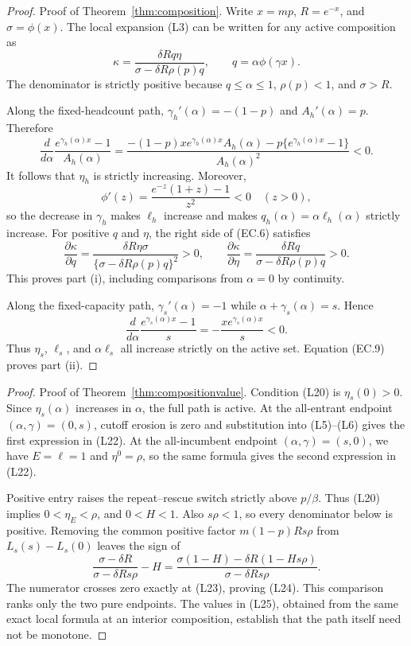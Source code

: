 \documentclass[mnsc,blindrev]{informs3}
\newcommand{\ph}{\phi}
\begin{document}
\begin{proof}{Proof of Theorem~\ref{thm:composition}.}
Write $x=mp$, $R=e^{-x}$, and $\sigma=\ph(x)$.  The local expansion (L3) can
be written for any active composition as
\[
 \kappa=\frac{\delta Rq\eta}
 {\sigma-\delta R\rho(p)q},
 \qquad q=\alpha\ph(\gamma x).                            \tag{EC.6}
\]
The denominator is strictly positive because
$q\le\alpha\le1$, $\rho(p)<1$, and $\sigma>R$.

Along the fixed-headcount path,
$\gamma_h'(\alpha)=-(1-p)$ and $A_h'(\alpha)=p$.  Therefore
\[
 \frac{d}{d\alpha}
 \frac{e^{\gamma_h(\alpha)x}-1}{A_h(\alpha)}
 =\frac{-(1-p)x e^{\gamma_h(\alpha)x}A_h(\alpha)
 -p\{e^{\gamma_h(\alpha)x}-1\}}{A_h(\alpha)^2}<0.        \tag{EC.7}
\]
It follows that $\eta_h$ is strictly increasing.  Moreover,
\[
 \ph'(z)=\frac{e^{-z}(1+z)-1}{z^2}<0\quad(z>0),           \tag{EC.8}
\]
so the decrease in $\gamma_h$ makes $\ell_h$ increase and makes
$q_h(\alpha)=\alpha\ell_h(\alpha)$ strictly increase.  For positive $q$ and
$\eta$, the right side of (EC.6) satisfies
\[
 \frac{\partial\kappa}{\partial q}
 =\frac{\delta R\eta\sigma}
  {\{\sigma-\delta R\rho(p)q\}^2}>0,\qquad
 \frac{\partial\kappa}{\partial\eta}
 =\frac{\delta Rq}{\sigma-\delta R\rho(p)q}>0.            \tag{EC.9}
\]
This proves part (i), including comparisons from $\alpha=0$ by continuity.

Along the fixed-capacity path, $\gamma_s'(\alpha)=-1$ while
$\alpha+\gamma_s(\alpha)=s$.  Hence
\[
 \frac{d}{d\alpha}\frac{e^{\gamma_s(\alpha)x}-1}{s}
 =-\frac{x e^{\gamma_s(\alpha)x}}s<0.                    \tag{EC.10}
\]
Thus $\eta_s$, $\ell_s$, and $\alpha\ell_s$ all increase strictly on the
active set.  Equation (EC.9) proves part (ii).
\Halmos\end{proof}

\begin{proof}{Proof of Theorem~\ref{thm:compositionvalue}.}
Condition (L20) is $\eta_s(0)>0$.  Since $\eta_s(\alpha)$ increases in
$\alpha$, the full path is active.  At the all-entrant endpoint
$(\alpha,\gamma)=(0,s)$, cutoff erosion is zero and substitution into
(L5)--(L6) gives the first expression in (L22).  At the all-incumbent endpoint
$(\alpha,\gamma)=(s,0)$, we have $E=\ell=1$ and $\eta^0=\rho$, so the same
formula gives the second expression in (L22).

Positive entry raises the repeat--rescue switch strictly above $p/\beta$.
Thus (L20) implies $0<\eta_E<\rho$, and $0<H<1$.  Also $s\rho<1$, so every
denominator below is positive.  Removing the common positive factor
$m(1-p)Rs\rho$ from $L_s(s)-L_s(0)$ leaves the sign of
\[
 \frac{\sigma-\delta R}{\sigma-\delta Rs\rho}-H
 =\frac{\sigma(1-H)-\delta R(1-Hs\rho)}
 {\sigma-\delta Rs\rho}.                                 \tag{EC.11}
\]
The numerator crosses zero exactly at (L23), proving (L24).  This comparison
ranks only the two pure endpoints.  The values in (L25), obtained from the
same exact local formula at an interior composition, establish that the path
itself need not be monotone.
\Halmos\end{proof}
\end{document}
